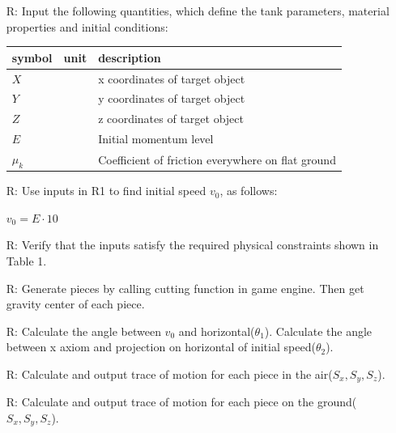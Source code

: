 \documentclass[12pt]{article}
\newcounter{reqnum} %
\begin{document}
	\noindent \begin{itemize}
		
		\item[R\refstepcounter{reqnum}\thereqnum \label{R_Inputs}:] 
		Input the following quantities, which define the tank parameters, material properties
		and initial conditions:
		\noindent \begin{longtable*}{l l l} 
			\toprule
			\textbf{symbol} & \textbf{unit} & \textbf{description}\\
			\midrule 
			$X$ & & x coordinates of target object
			\\
			$Y$ & & y coordinates of target object
			\\
			$Z$ & & z coordinates of target object
			\\
			$E$ & & Initial momentum level
			\\
			$\mu_{k}$ & & Coefficient of friction everywhere on flat ground
			\\
			\bottomrule
		\end{longtable*}
		
		\item[R\refstepcounter{reqnum}\thereqnum \label{R_OutputInputs}:] Use inputs in R1 to find initial speed $v_{0}$, as follows:
		
		$v_{0}=E \cdot 10$
		
		\item[R\refstepcounter{reqnum}\thereqnum \label{R_VerifyOutput}:] Verify that the inputs satisfy the required physical constraints shown in Table 1.
		
		\item[R\refstepcounter{reqnum}\thereqnum \label{R_piece}:] Generate pieces by calling cutting function in game engine. Then get gravity center of each piece.
		
		\item[R\refstepcounter{reqnum}\thereqnum \label{R_Calculate}:]
		Calculate the angle between $v_{0}$ and horizontal($\theta _{1}$). Calculate the angle between x axiom and projection on horizontal of initial speed($\theta _{2}$).
		
		\item[R\refstepcounter{reqnum}\thereqnum \label{R_Output1}:] 
		Calculate and output trace of motion for each piece in the air($S_{x},S_{y},S_{z}$).
		
		\item[R\refstepcounter{reqnum}\thereqnum \label{R_Output2}:] 
		Calculate and output trace of motion for each piece on the ground($S_{x},S_{y},S_{z}$).
		
	\end{itemize}
	
\end{document}
